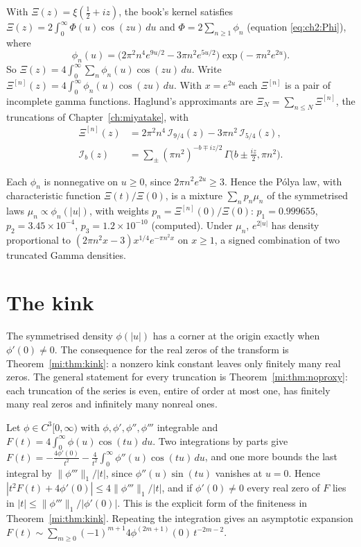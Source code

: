 With $\Xi(z)=\xi(\tfrac12+iz)$, the book's kernel satisfies $\Xi(z)=2\int_0^\infty\Phi(u)\cos(zu)\,du$ and $\Phi=2\sum_{n\ge1}\phi_n$ (equation \eqref{eq:ch2:Phi}), where
\[
\phi_n(u)=\big(2\pi^2n^4e^{9u/2}-3\pi n^2e^{5u/2}\big)\exp\!\big(-\pi n^2e^{2u}\big).
\]
So $\Xi(z)=4\int_0^\infty\sum_n\phi_n(u)\cos(zu)\,du$. Write $\Xi^{[n]}(z)=4\int_0^\infty\phi_n(u)\cos(zu)\,du$. With $x=e^{2u}$ each $\Xi^{[n]}$ is a pair of incomplete gamma functions. Haglund's approximants \cite{Haglund09} are $\Xi_N=\sum_{n\le N}\Xi^{[n]}$, the truncations of Chapter~\ref{ch:miyatake}, with
\begin{align*}
\Xi^{[n]}(z)&=2\pi^2n^4\,\mathcal I_{9/4}(z)-3\pi n^2\,\mathcal I_{5/4}(z),\\
\mathcal I_b(z)&=\sum_\pm(\pi n^2)^{-b\mp iz/2}\,\Gamma\big(b\pm\tfrac{iz}2,\pi n^2\big).
\end{align*}

\begin{proposition}\label{mh:prop:mixture}
Each $\phi_n$ is nonnegative on $u\ge0$, since $2\pi n^2e^{2u}\ge3$. Hence the P\'olya law, with characteristic function $\Xi(t)/\Xi(0)$, is a mixture $\sum_np_n\mu_n$ of the symmetrised laws $\mu_n\propto\phi_n(|u|)$, with weights $p_n=\Xi^{[n]}(0)/\Xi(0)$: $p_1=0.999655$, $p_2=3.45\times10^{-4}$, $p_3=1.2\times10^{-10}$ (computed). Under $\mu_n$, $e^{2|u|}$ has density proportional to $(2\pi n^2x-3)x^{1/4}e^{-\pi n^2x}$ on $x\ge1$, a signed combination of two truncated Gamma densities.
\end{proposition}

\section{The kink}\label{mh:sec:kink}

The symmetrised density $\phi(|u|)$ has a corner at the origin exactly when $\phi'(0)\ne0$. The consequence for the real zeros of the transform is Theorem~\ref{mi:thm:kink}: a nonzero kink constant leaves only finitely many real zeros. The general statement for every truncation is Theorem~\ref{mi:thm:noproxy}: each truncation of the series is even, entire of order at most one, has finitely many real zeros and infinitely many nonreal ones.

\begin{remark}\label{mh:rem:kink}
Let $\phi\in C^3[0,\infty)$ with $\phi,\phi',\phi'',\phi'''$ integrable and $F(t)=4\int_0^\infty\phi(u)\cos(tu)\,du$. Two integrations by parts give $F(t)=-\frac{4\phi'(0)}{t^2}-\frac{4}{t^2}\int_0^\infty\phi''(u)\cos(tu)\,du$, and one more bounds the last integral by $\|\phi'''\|_1/|t|$, since $\phi''(u)\sin(tu)$ vanishes at $u=0$. Hence $|t^2F(t)+4\phi'(0)|\le4\|\phi'''\|_1/|t|$, and if $\phi'(0)\ne0$ every real zero of $F$ lies in $|t|\le\|\phi'''\|_1/|\phi'(0)|$. This is the explicit form of the finiteness in Theorem~\ref{mi:thm:kink}. Repeating the integration gives an asymptotic expansion $F(t)\sim\sum_{m\ge0}(-1)^{m+1}4\phi^{(2m+1)}(0)\,t^{-2m-2}$.
\end{remark}

